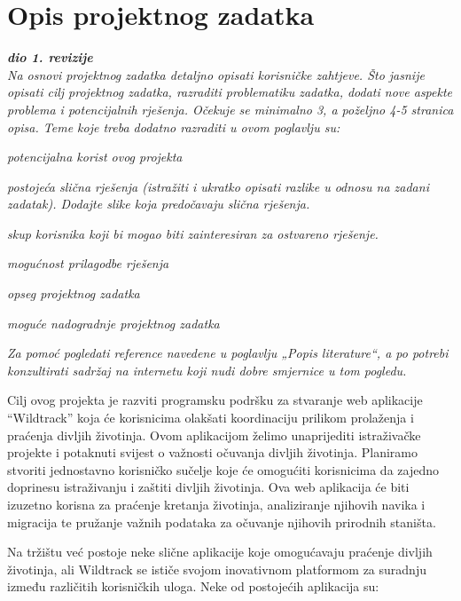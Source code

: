 \chapter{Opis projektnog zadatka}
		
		\textbf{\textit{dio 1. revizije}}\\
		
		\textit{Na osnovi projektnog zadatka detaljno opisati korisničke zahtjeve. Što jasnije opisati cilj projektnog zadatka, razraditi problematiku zadatka, dodati nove aspekte problema i potencijalnih rješenja. Očekuje se minimalno 3, a poželjno 4-5 stranica opisa.	Teme koje treba dodatno razraditi u ovom poglavlju su:}
		\begin{packed_item}
			\item \textit{potencijalna korist ovog projekta}
			\item \textit{postojeća slična rješenja (istražiti i ukratko opisati razlike u odnosu na zadani zadatak). Dodajte slike koja predočavaju slična rješenja.}
			\item \textit{skup korisnika koji bi mogao biti zainteresiran za ostvareno rješenje.}
			\item \textit{mogućnost prilagodbe rješenja }
			\item \textit{opseg projektnog zadatka}
			\item \textit{moguće nadogradnje projektnog zadatka}
		\end{packed_item}
		
		\textit{Za pomoć pogledati reference navedene u poglavlju „Popis literature“, a po potrebi konzultirati sadržaj na internetu koji nudi dobre smjernice u tom pogledu.} \newline
		
		
		Cilj ovog projekta je razviti programsku podršku za stvaranje web aplikacije “Wildtrack” koja će korisnicima olakšati koordinaciju prilikom prolaženja i praćenja divljih životinja. Ovom aplikacijom želimo unaprijediti istraživačke projekte i potaknuti svijest o važnosti očuvanja divljih životinja. Planiramo stvoriti jednostavno korisničko sučelje koje će omogućiti korisnicima da zajedno doprinesu istraživanju i zaštiti divljih životinja. Ova web aplikacija će biti izuzetno korisna za praćenje kretanja životinja, analiziranje njihovih navika i migracija te pružanje važnih podataka za očuvanje njihovih prirodnih staništa.\newline
		
		Na tržištu već postoje neke slične aplikacije koje omogućavaju praćenje divljih životinja, ali Wildtrack se ističe svojom inovativnom platformom za suradnju između različitih korisničkih uloga. Neke od postojećih aplikacija su:
		
